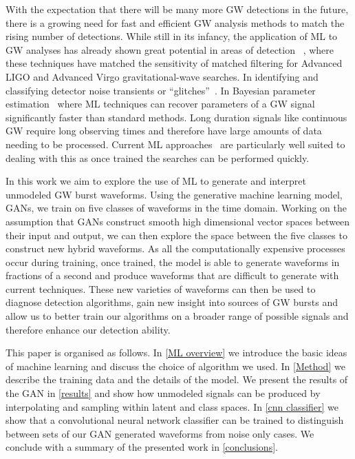 \documentclass[12pt]{iopart}
\begin{document}
%
With the expectation that there will be many more \ac{GW} detections in the
future, there is a growing need for fast and efficient \ac{GW} analysis methods
to match the rising number of detections. While still in its infancy, the application of \ac{ML} to \ac{GW} analyses has already shown great potential in areas of detection ~\cite{Gabbard2017,Gebhard_2019,Krastev_2020}, where these techniques have matched the sensitivity of matched filtering for Advanced LIGO and Advanced Virgo gravitational-wave searches. In identifying and classifying detector noise transients or  ``glitches''~\cite{Bahaadini, George_2018,Razzano_2018, 2020arXiv200801262G}. In Bayesian parameter
estimation~\cite{gabbard2019bayesian, green2020gravitationalwave} where \ac{ML} techniques can recover parameters of a \ac{GW} signal significantly faster than standard methods. Long duration signals like continuous \ac{GW} require long observing times and therefore have large amounts of data needing to be processed. Current \ac{ML} approaches~\cite{2020PhRvD.102b2005D, 2019PhRvD.100d4009D, 2020arXiv200708207B} are particularly well suited to dealing with this as once trained the searches can be performed quickly.

%
In this work we aim to explore the use of \ac{ML} to generate and interpret
unmodeled \ac{GW} burst waveforms. Using the generative machine learning
model, \acp{GAN}, we train on five classes of waveforms in the time domain. Working on the assumption that \acp{GAN} construct smooth
 high dimensional vector spaces between their input and output, we can then
explore the space between the five classes to construct new
hybrid waveforms. As all the computationally expensive
processes occur during training, once trained, the model is able to
generate waveforms in fractions of a second and produce waveforms that are difficult to generate with current
techniques. These new varieties of waveforms can then be used to diagnose
detection algorithms, gain new insight into sources of \ac{GW}
bursts and  allow us to better train our algorithms on a
broader range of possible signals and therefore enhance our detection ability. 

%
This paper is organised as follows. In \cref{ML overview} we introduce the basic ideas of machine learning and discuss the choice of algorithm we used. In \cref{Method} we describe the training data and the details of the model. We present the results of the GAN in \cref{results} and show how unmodeled signals can be produced by interpolating and sampling within latent and class spaces. In \cref{cnn classifier} we show that a convolutional neural network classifier can be trained to distinguish between sets of our GAN generated waveforms from noise only cases. We conclude with a summary of the presented work in \cref{conclusions}.
\end{document}
